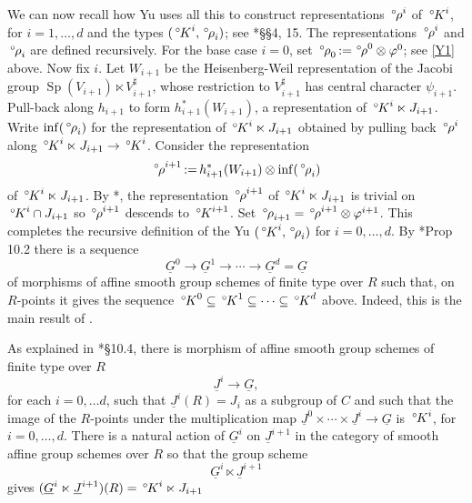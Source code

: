 \documentclass[10pt]{amsart}
\theoremstyle{plain}
\theoremstyle{definition}
\newcommand{\ceq}{{\, :=\, }}
\newcommand{\Sp}{{\operatorname{Sp}}}
\newcommand{\oK}{{\,^\circ \hskip-1pt K}}
\newcommand{\orho}{{\,^\circ \hskip-1pt \rho}}
\begin{document}
We can now recall how Yu uses all this to construct representations $\orho^i$ of $\oK^i$, for $i=1, \ldots, d$ and the types $(\oK^i,\orho_i)$; see \cite{yu:01a}*{\S\S 4, 15}.
The representations $\orho^i$ and $\orho_i$ are defined recursively.
For the base case $i=0$, set $\orho_0 \ceq \orho^0\otimes \varphi^0$; see \ref{Y1} above.
Now fix $i$.
Let $W_{i+1}$ be the Heisenberg-Weil representation of the Jacobi group $\Sp(V_{i+1})\ltimes V_{i+1}^\sharp$, whose restriction to $V_{i+1}^\sharp$ has central character $\psi_{i+1}$.
Pull-back along $h_{i+1}$ to form $h_{i+1}^*(W_{i+1})$, a representation of $\oK^i \ltimes J_{i+1}$.
Write $\inf(\orho_i)$ for the representation of $\oK^i \ltimes J_{i+1}$ obtained by pulling back $\orho^i$ along $\oK^i \ltimes J_{i+1} \to \oK^i$. 
Consider the representation
\begin{equation}\label{eq:tensor}
\orho^{i+1} \ceq h_{i+1}^*(W_{i+1}) \otimes \inf(\orho_i)
\end{equation}
of $\oK^i \ltimes J_{i+1}$.
By \cite{yu:01a}*{}, the representation $\orho^{i+1}$ of $\oK^i \ltimes J_{i+1}$ is trivial on $\oK^{i}\cap J_{i+1}$ so $\orho^{i+1}$ descends to $\oK^{i+1}$. 
%
Set $\orho_{i+1} = \orho^{i+1}\otimes \varphi^{i+1}$.
This completes the recursive definition of the Yu $(\oK^i,\orho_i)$ for $i=0, \ldots , d$.
By \cite{Yu:models}*{Prop 10.2} there is a sequence  
\[
\underline{G}^0 \to \underline{G}^1 \to \cdots \to \underline{G}^d = \underline{G}
\]
of morphisms of affine smooth group schemes of finite type over $R$ such that, on $R$-points it gives the sequence $\oK^0 \subseteq \oK^1 \subseteq \cdots \subseteq \oK^d$ above.
Indeed, this is the main result of \cite{Yu:models}.

As explained in \cite{Yu:models}*{\S 10.4}, there is morphism of affine smooth group schemes of finite type over $R$ 
\[
\underline{J}^i \to \underline{G},
\] 
for each $i=0,\ldots d$, such that $\underline{J}^i(R) = J_i$ as a subgroup of $C$ and such that the image of the $R$-points under the multiplication map $\underline{J}^0 \times \cdots \times \underline{J}^i \to \underline{G}$ is $\oK^i$, for $i=0, \ldots , d$.
There is a natural action of $\underline{G}^i$ on $\underline{J}^{i+1}$ in the category of smooth affine group schemes over $R$ so that the group scheme
\[
\underline{G}^i \ltimes \underline{J}^{i+1}
\]
gives $(\underline{G}^i \ltimes \underline{J}^{i+1})(R) = \oK^i \ltimes J_{i+1}$

\newcommand{\reductive}{{\operatorname{red}}}
\end{document}
